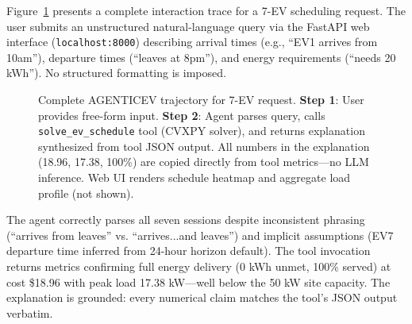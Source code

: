 \documentclass[11pt]{article}
\begin{document}
Figure~\ref{fig:trajectory} presents a complete interaction trace for a 7-EV scheduling request. The user submits an unstructured natural-language query via the FastAPI web interface (\texttt{localhost:8000}) describing arrival times (e.g., ``EV1 arrives from 10am''), departure times (``leaves at 8pm''), and energy requirements (``needs 20 kWh''). No structured formatting is imposed.

\begin{figure}[h]
    \centering
    \caption{Complete AGENTICEV trajectory for 7-EV request. \textbf{Step 1}: User provides free-form input. \textbf{Step 2}: Agent parses query, calls \texttt{solve\_ev\_schedule} tool (CVXPY solver), and returns explanation synthesized from tool JSON output. All numbers in the explanation (18.96, 17.38, 100\%) are copied directly from tool metrics—no LLM inference. Web UI renders schedule heatmap and aggregate load profile (not shown).}
    \label{fig:trajectory}
\end{figure}

The agent correctly parses all seven sessions despite inconsistent phrasing (``arrives from leaves'' vs. ``arrives...and leaves'') and implicit assumptions (EV7 departure time inferred from 24-hour horizon default). The tool invocation returns metrics confirming full energy delivery (0 kWh unmet, 100\% served) at cost \$18.96 with peak load 17.38 kW—well below the 50 kW site capacity. The explanation is grounded: every numerical claim matches the tool's JSON output verbatim.
\end{document}

